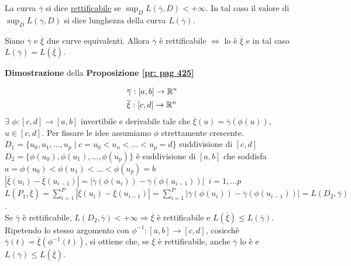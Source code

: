 \segnaposto %


\begin{definition}
	La curva $\overline{\gamma}$ si dice \underline{rettificabile} se $\sup_D L(\overline{\gamma},D)<+\infty$. In tal caso il valore di $\sup_D L(\overline{\gamma},D)$ si dice lunghezza della curva $L(\overline{\gamma})$.
\end{definition}


\begin{proposition}
	
	\label{pr: pag 425}
	Siano $\overline{\gamma}$ e $\overline{\xi}$ due curve equivalenti. Allora $\overline{\gamma}$ è rettificabile $\Leftrightarrow $ lo è $\overline{\xi}$ e in tal caso $L(\overline{\gamma})=L(\overline{\xi})$.
\end{proposition}


\begin{dembar}
	\textbf{Dimostrazione} della \textbf{Proposizione \ref{pr: pag 425}}
	
	\begin{align*}
		&\overline{\gamma}:[a,b]\rightarrow \mathbb{R}^n\\
		&\overline{\xi}:[c,d]\rightarrow \mathbb{R}^n
	\end{align*}
	$\exists \,\,\phi: [c,d]\rightarrow [a,b]$ invertibile e derivabile tale che $\overline{\xi}(u)=\overline{\gamma}(\phi(u))$, $u \in [c,d]$. Per fissare le idee assumiamo $\phi$ strettamente crescente.\\
	$D_1=\{ u_0,u_1,...,u_p \mid c=u_0<u_n<...<u_p=d \}$ suddivisione di $[c,d]$\\
	$D_2=\{\phi(u_0),\phi(u_1),...,\phi(u_p)\}$ è suddivisione di $[a,b]$ che soddisfa $a = \phi (u_0)<\phi(u_1)<...<\phi(u_p)=b$\\
	$|\overline{\xi} (u_i)-\overline{\xi}(u_{i-1})|=|\overline{\gamma}(\phi(u_i))-\overline{\gamma}(\phi(u_{i-1}))|\,\,\, i=1,...p$\\
	$L(P_1,\overline{\xi})=\sum_{i=1}^P|\overline{\xi}(u_i)-\overline{\xi}(u_{i-1})|=\sum_{i=1}^P|\overline{\gamma}(\phi(u_i))-\overline{\gamma}(\phi(u_{i-1}))|=L(D_2,\overline{\gamma})$.\\
	Se $\overline{\gamma}$ è rettificabile, $L(D_2,\overline{\gamma})< +\infty \Rightarrow \overline{\xi}$ è rettificabile e $L(\overline{\xi})\leq L(\overline{\gamma})$.\\
	Ripetendo lo stesso argomento con $\phi^{-1}:[a,b]\rightarrow [c,d]$, cosicchè $\overline{\gamma}(t)=\overline{\xi}(\phi^{-1}(t))$, si ottiene che, se $\overline{\xi}$ è rettificabile, anche $\overline{\gamma}$ lo è e $L(\overline{\gamma})\leq L(\overline{\xi})$.
\end{dembar}


